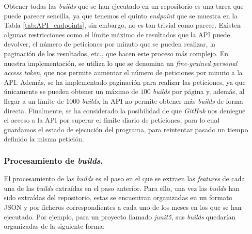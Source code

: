 Obtener todas las \textit{builds} que se han ejecutado en un repositorio es una tarea que puede
parecer sencilla, ya que tenemos el quinto \textit{endpoint} que se muestra en la Tabla
\ref{tab:API_endpoints}, sin embargo, no es tan trivial como parece. Existen algunas restricciones
como el límite máximo de resultados que la API puede devolver, el número de peticiones por minuto
que se pueden realizar, la paginación de los resultados, etc., que hacen este proceso más
complejo. En nuestra implementación, se utiliza lo que se denomina un \textit{fine-grained
personal access token}, que nos permite aumentar el número de peticiones por minuto a la API.
Además, se ha implementado paginación para realizar las peticiones, ya que únicamente se pueden
obtener un máximo de $100$ \textit{builds} por página y, además, al llegar a un límite de $1000$
\textit{builds}, la API no permite obtener más \textit{builds} de forma directa. Finalmente, se
ha considerado la posibilidad de que \textit{GitHub} nos deniegue el acceso a la API por superar
el límite diario de peticiones, para lo cual guardamos el estado de ejecución del programa, para
reintentar pasado un tiempo definido la misma petición.

\subsubsection{Procesamiento de \textit{builds}.}
El procesamiento de las \textit{builds} es el paso en el que se extraen las \textit{features} de
cada una de las \textit{builds} extraídas en el paso anterior. Para ello, una vez las
\textit{builds} han sido extraídas del repositorio, estas se encuentran organizadas en un formato
JSON y por ficheros correspondientes a cada uno de los meses en los que se han ejecutado. Por
ejemplo, para un proyecto llamado \textit{junit5}, sus \textit{builds} quedarían organizadas de la
siguiente forma:

